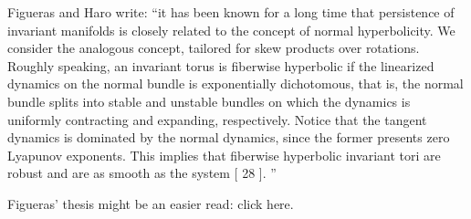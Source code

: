\begin{description}
{Figueras and Haro write:
``it has been known for a long time that persistence of invariant
manifolds is closely related to the concept of normal
hyperbolicity. %
We consider the analogous
concept, tailored for skew products over rotations. Roughly speaking, an
invariant torus is fiberwise hyperbolic if the linearized dynamics on the
normal bundle is exponentially dichotomous, that is, the normal bundle
splits into stable and unstable bundles on which the dynamics is
uniformly contracting and expanding, respectively. Notice that the
tangent dynamics is dominated by the normal dynamics, since the former
presents zero Lyapunov exponents. This implies that fiberwise hyperbolic
invariant tori are robust and are as smooth as the system [ 28 ].
''

Figueras' thesis might be an easier read:
{click here}.
    }


\end{description}
